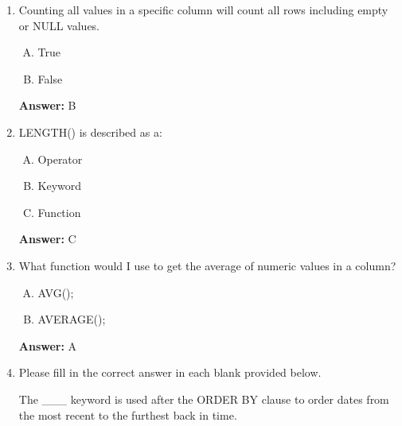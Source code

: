 \documentclass[12pt]{article}
\begin{document}
\begin{enumerate}[1.]
    \item

    Counting all values in a specific column will count all rows including empty or NULL values.

    \bigskip

    \begin{enumerate}[A.]
        \item True
        \item False
    \end{enumerate}

    \bigskip

    \textbf{Answer:} B

    \item

    LENGTH() is described as a:

    \bigskip

    \begin{enumerate}[A.]
        \item Operator
        \item Keyword
        \item Function
    \end{enumerate}

    \bigskip

    \textbf{Answer:} C


    \item

    What function would I use to get the average of numeric values in a column?


    \bigskip

    \begin{enumerate}[A.]
        \item AVG();
        \item AVERAGE();

    \end{enumerate}

    \bigskip

    \textbf{Answer:} A

    \item

    Please fill in the correct answer in each blank provided below.

    \bigskip

    The \_\_\_  keyword is used after the ORDER BY clause to order dates from the most recent to the furthest back in time.

    \bigskip


\end{enumerate}
\end{document}

